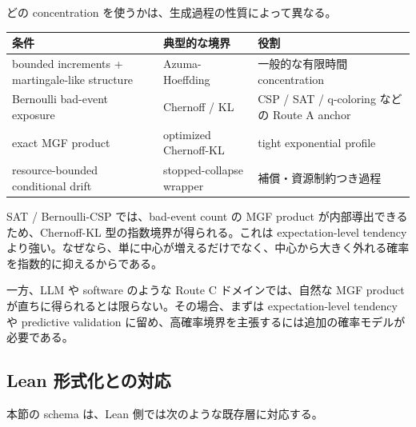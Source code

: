 \documentclass[12pt,a4paper]{article}
\begin{document}
どの concentration を使うかは、生成過程の性質によって異なる。

{\def\LTcaptype{table} %
\begin{longtable}[]{@{}
  >{\raggedright\arraybackslash}p{}
  >{\raggedright\arraybackslash}p{}
  >{\raggedright\arraybackslash}p{}@{}}
\toprule\noalign{}
\begin{minipage}[b]{\linewidth}\raggedright
条件
\end{minipage} & \begin{minipage}[b]{\linewidth}\raggedright
典型的な境界
\end{minipage} & \begin{minipage}[b]{\linewidth}\raggedright
役割
\end{minipage} \\
\midrule\noalign{}
\endhead
\bottomrule\noalign{}
\endlastfoot
bounded increments + martingale-like structure & Azuma-Hoeffding & 一般的な有限時間 concentration \\
Bernoulli bad-event exposure & Chernoff / KL & CSP / SAT / q-coloring などの Route A anchor \\
exact MGF product & optimized Chernoff-KL & tight exponential profile \\
resource-bounded conditional drift & stopped-collapse wrapper & 補償・資源制約つき過程 \\
\end{longtable}
}

SAT / Bernoulli-CSP では、bad-event count の MGF product が内部導出できるため、Chernoff-KL 型の指数境界が得られる。これは expectation-level tendency より強い。なぜなら、単に中心が増えるだけでなく、中心から大きく外れる確率を指数的に抑えるからである。

一方、LLM や software のような Route C ドメインでは、自然な MGF product が直ちに得られるとは限らない。その場合、まずは expectation-level tendency や predictive validation に留め、高確率境界を主張するには追加の確率モデルが必要である。

\subsection{Lean 形式化との対応}\label{lean-ux5f62ux5f0fux5316ux3068ux306eux5bfeux5fdc-1}

本節の schema は、Lean 側では次のような既存層に対応する。
\end{document}
